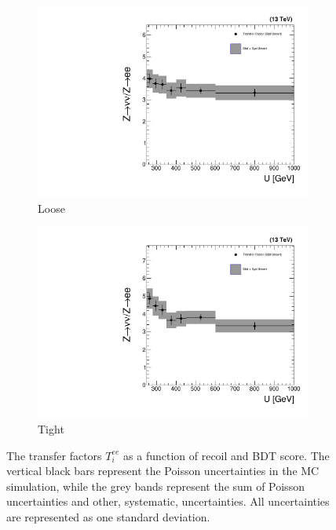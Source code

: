 \begin{figure}[]
    \begin{center}
        \begin{subfigure}[t]{0.49\textwidth}
            \includegraphics[width=\textwidth]{figures/monotop/xfer/rfactor_dielectron_loose.pdf}
            \caption{Loose}
        \end{subfigure}
        \begin{subfigure}[t]{0.49\textwidth}
            \includegraphics[width=\textwidth]{figures/monotop/xfer/rfactor_dielectron.pdf}
            \caption{Tight}
        \end{subfigure}
        \caption{The transfer factors $T_i^{ee}$ as a function of recoil and BDT score. The vertical black bars represent the Poisson uncertainties in the MC simulation, while the grey bands represent the sum of Poisson uncertainties and other, systematic, uncertainties. All uncertainties are represented as one standard deviation.}
        \label{fig:mt:zee_xfer}
    \end{center}
\end{figure}

